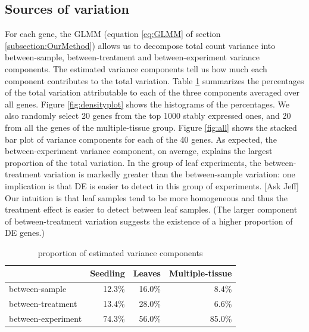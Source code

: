 \documentclass[11pt, a4paper]{article}
\begin{document}


\subsection{Sources of variation}\label{Section:varianceComp}

For each gene, the GLMM (equation \ref{eq:GLMM}	of section \ref{subsection:OurMethod}) allows us to decompose
total count variance into between-sample, between-treatment and
between-experiment variance components. The estimated variance components tell us how much each component contributes
to the total variation. Table \ref{table:percentageofvariation} summarizes the percentages of the total variation attributable to each of the three components averaged over all genes. Figure \ref{fig:densityplot} shows the histograms of the percentages. We also randomly select 20 genes from the top 1000 stably expressed ones, and 20 from all the genes of the multiple-tissue group. Figure \ref{fig:all} shows the stacked bar plot of variance components for each of the 40 genes.
As expected, the between-experiment variance component, on average,
explains the largest proportion of the total variation. In the group of leaf
experiments, the between-treatment variation is markedly greater than the
between-sample variation: one implication is that DE is easier to detect in
this group of experiments.  [Ask Jeff] Our intuition is
that leaf samples tend to be more homogeneous and thus the treatment effect is
easier to detect between leaf samples. (The larger component of
between-treatment variation suggests the existence of a higher proportion of
DE genes.) 
 
 \begin{center}
 \begin{table}[h!]
 	\centering
 	\caption{proportion of estimated variance components}
	 \label{table:percentageofvariation}
 	\begin{tabular}{lrrr}\hline
 		& Seedling & Leaves & Multiple-tissue \\  \hline
 		between-sample     & 12.3\%   & 16.0\% & 8.4\%           \\
 		between-treatment  & 13.4\%   & 28.0\% & 6.6\%           \\
 		between-experiment & 74.3\%   & 56.0\% & 85.0\%         \\ \hline
 	\end{tabular}
 \end{table}
\end{center}
\end{document}
